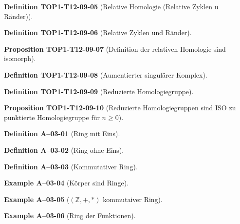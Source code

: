 \documentclass[10pt, letterpaper]{article}
\newcommand{\Z}{\mathbb{Z}}
\newcommand{\CustomHeading}[3]{%
  \par\medskip\noindent%
  \textbf{#1 #2} \textnormal{(#3)}.\enskip%
}
\newenvironment{DEF}[2]{\CustomHeading{Definition}{#1}{#2}}{}
\newenvironment{PROP}[2]{\CustomHeading{Proposition}{#1}{#2}}{}
\newenvironment{EXA}[2]{\CustomHeading{Example}{#1}{#2}}{}
\begin{document}
\begin{DEF}{TOP1-T12-09-05}{Relative Homologie (Relative Zyklen u Ränder)}
\end{DEF}

\begin{DEF}{TOP1-T12-09-06}{Relative Zyklen und Ränder}
\end{DEF}

\begin{PROP}{TOP1-T12-09-07}{Definition der relativen Homologie sind isomorph}
\end{PROP}

\begin{DEF}{TOP1-T12-09-08}{Aumentierter singulärer Komplex}
\end{DEF}

\begin{DEF}{TOP1-T12-09-09}{Reduzierte Homologiegruppe}
\end{DEF}

\begin{PROP}{TOP1-T12-09-10}{Reduzierte Homologiegruppen sind ISO zu punktierte Homologiegruppe für $n\geq 0$}
\end{PROP}

\begin{DEF}{A--03-01}{Ring mit Eins}
\end{DEF}

\begin{DEF}{A--03-02}{Ring ohne Eins}
\end{DEF}

\begin{DEF}{A--03-03}{Kommutativer Ring}
\end{DEF}

\begin{EXA}{A--03-04}{Körper sind Ringe}
\end{EXA}

\begin{EXA}{A--03-05}{$(\Z,+,*)$ kommutaiver Ring}
\end{EXA}

\begin{EXA}{A--03-06}{Ring der Funktionen}
\end{EXA}
\end{document}
